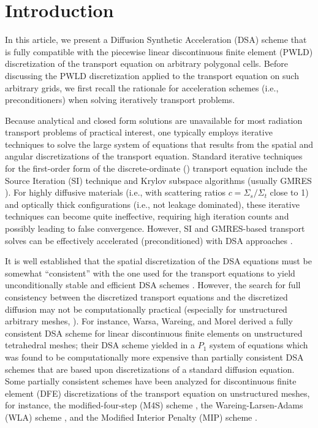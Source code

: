 \section{Introduction}

In this article, we present a Diffusion Synthetic Acceleration (DSA) scheme
that is fully compatible with the piecewise linear discontinuous finite
element (PWLD) discretization of the transport equation on arbitrary
polygonal cells. Before discussing the PWLD discretization applied
to the transport equation on such arbitrary grids, we first recall the
rationale for acceleration schemes (i.e., preconditioners) when solving
iteratively transport problems.


Because analytical and closed form solutions are unavailable for most
radiation transport problems of practical interest, one typically employs
iterative techniques to solve the large system of equations that results from
the spatial and angular discretizations of the transport equation. Standard
iterative techniques for the first-order form of the discrete-ordinate (\sn)
transport equation include the Source Iteration (SI) technique and Krylov 
subspace algorithms (usually GMRES \cite{gmres}). For highly diffusive materials 
(i.e., with scattering ratios $c=\Sigma_s / \Sigma_t $ close to 1) and optically 
thick configurations (i.e., not leakage dominated), these iterative techniques 
can become quite ineffective, requiring high iteration counts and possibly 
leading to false convergence. However, SI and GMRES-based transport solves 
can be effectively accelerated (preconditioned) with DSA approaches 
\cite{dsa_ref,larsen_dsa,consistent_p1,m4s,wla,mip}. 


It is well established that the spatial discretization of the DSA equations
must be somewhat ``consistent'' with the one used for the \sn transport equations to
yield unconditionally stable and efficient DSA schemes
\cite{dsa_ref,larsen_dsa,consistent_p1,m4s,wla,mip}. However, the search for full
consistency between the discretized transport equations and the discretized
diffusion may not be computationally practical (especially for unstructured
arbitrary meshes, \cite{dsa_ref}). For instance, Warsa, Wareing, and
Morel \cite{consistent_p1} derived a fully consistent DSA scheme for linear
discontinuous finite elements on unstructured tetrahedral meshes; their DSA
scheme yielded in a $P_1$ system of equations which was found to be
computationally more expensive than partially consistent DSA schemes that are
based upon discretizations of a standard diffusion equation. Some partially 
consistent schemes have been analyzed for discontinuous finite element
(DFE) discretizations of the transport equation on unstructured meshes, for
instance, the modified-four-step (M4S) scheme \cite{m4s}, the
Wareing-Larsen-Adams (WLA) scheme \cite{wla}, and the Modified Interior
Penalty (MIP) scheme \cite{mip}.


